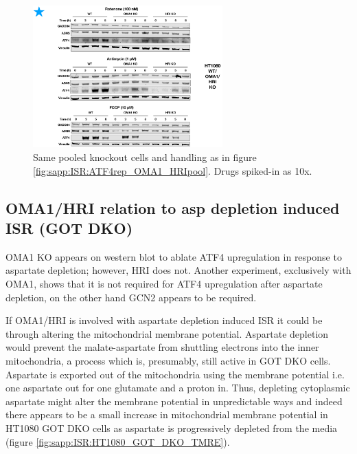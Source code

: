 \begin{figure}[t]
    \centering
    \includegraphics[width=0.65\textwidth]{figures/sapp/ISR/ATF4wes_OMA1_HRIpool.pdf}
    \caption[ATF4 post mito inhib. OMA1/HRI KO, western]{
    Same pooled knockout cells and handling as in figure \ref{fig:sapp:ISR:ATF4rep_OMA1_HRIpool}.
    Drugs spiked-in as 10x.
    }
    \label{fig:sapp:ISR:ATF4wes_OMA1_HRIpool}
\end{figure}






\FloatBarrier
\subsection{OMA1/HRI relation to asp depletion induced ISR (GOT DKO)}
OMA1 KO appears on western blot to ablate ATF4 upregulation in response to aspartate depletion; however, HRI does not.
Another experiment, exclusively with OMA1, shows that it is not required for ATF4 upregulation after aspartate depletion, on the other hand GCN2 appears to be required.

If OMA1/HRI is involved with aspartate depletion induced ISR it could be through altering the mitochondrial membrane potential.
Aspartate depletion would prevent the malate-aspartate from shuttling electrons into the inner mitochondria, a process which is, presumably, still active in GOT DKO cells.
Aspartate is exported out of the mitochondria using the membrane potential i.e. one aspartate out for one glutamate and a proton in.
Thus, depleting cytoplasmic aspartate might alter the membrane potential in unpredictable ways and indeed there appears to be a small increase in mitochondrial membrane potential in HT1080 GOT DKO cells as aspartate is progressively depleted from the media (figure \ref{fig:sapp:ISR:HT1080_GOT_DKO_TMRE}).

